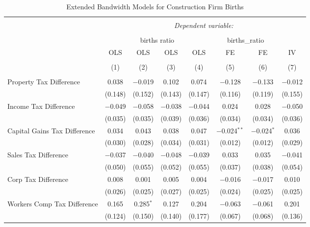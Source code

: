 
\begin{table}[!htbp] \centering 
  \caption{Extended Bandwidth Models for  Construction Firm Births} 
  \label{} 
\begin{tabular}{@{\extracolsep{5pt}}lccccccc} 
\\[-1.8ex]\hline 
\hline \\[-1.8ex] 
 & \multicolumn{7}{c}{\textit{Dependent variable:}} \\ 
\cline{2-8} 
\\[-1.8ex] & \multicolumn{4}{c}{births ratio} & \multicolumn{2}{c}{births\_ratio} &   \\ 
 & OLS & OLS & OLS & OLS & FE & FE & IV \\ 
\\[-1.8ex] & (1) & (2) & (3) & (4) & (5) & (6) & (7)\\ 
\hline \\[-1.8ex] 
 Property Tax Difference & 0.038 & $-$0.019 & 0.102 & 0.074 & $-$0.128 & $-$0.133 & $-$0.012 \\ 
  & (0.148) & (0.152) & (0.143) & (0.147) & (0.116) & (0.119) & (0.155) \\ 
  Income Tax Difference & $-$0.049 & $-$0.058 & $-$0.038 & $-$0.044 & 0.024 & 0.028 & $-$0.050 \\ 
  & (0.035) & (0.035) & (0.039) & (0.036) & (0.034) & (0.034) & (0.036) \\ 
  Capital Gains Tax Difference & 0.034 & 0.043 & 0.038 & 0.047 & $-$0.024$^{**}$ & $-$0.024$^{*}$ & 0.036 \\ 
  & (0.030) & (0.028) & (0.034) & (0.031) & (0.012) & (0.012) & (0.029) \\ 
  Sales Tax Difference & $-$0.037 & $-$0.040 & $-$0.048 & $-$0.039 & 0.033 & 0.035 & $-$0.041 \\ 
  & (0.050) & (0.055) & (0.052) & (0.055) & (0.037) & (0.038) & (0.054) \\ 
  Corp Tax Difference & 0.008 & 0.001 & 0.005 & 0.004 & $-$0.016 & $-$0.017 & 0.010 \\ 
  & (0.026) & (0.025) & (0.027) & (0.025) & (0.024) & (0.025) & (0.025) \\ 
  Workers Comp Tax Difference & 0.165 & 0.285$^{*}$ & 0.127 & 0.204 & $-$0.063 & $-$0.061 & 0.201 \\ 
  & (0.124) & (0.150) & (0.140) & (0.177) & (0.067) & (0.068) & (0.136) \\ 

\end{tabular}
\end{table}
